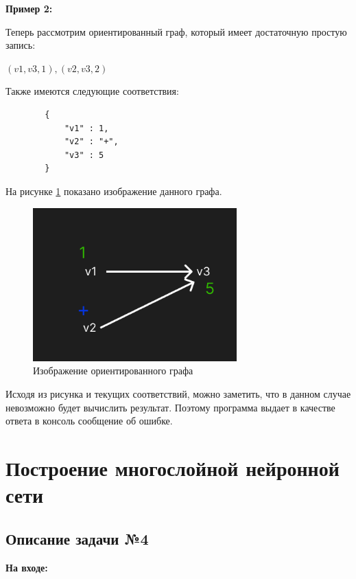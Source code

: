 \documentclass[bachelor, och, otchet]{template}
\begin{document}
    \textbf{Пример 2:}

    Теперь рассмотрим ориентированный граф, который имеет достаточную простую запись:

    \begin{center}
        $(v1, v3, 1), (v2, v3, 2)$
    \end{center}

    Также имеются следующие соответствия:

    \begin{verbatim}
        {
            "v1" : 1,
            "v2" : "+",
            "v3" : 5
        }
    \end{verbatim}
    
    На рисунке \ref{p32} показано изображение данного графа.

    \begin{figure}[H]
        \centering
        \includegraphics[width=0.7\textwidth]{pics/3.2.png}
        \caption{Изображение ориентированного графа}
        \label{p32}
    \end{figure} 

    Исходя из рисунка и текущих соответствий, можно заметить, что в данном случае невозможно
    будет вычислить результат. Поэтому программа выдает в качестве ответа в консоль сообщение
    об ошибке.

\section{Построение многослойной нейронной сети}

\subsection{Описание задачи №4}

    \textbf{На входе:} 
\end{document}
